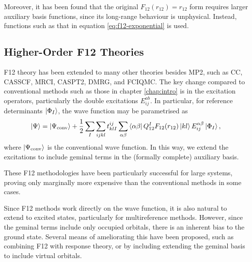 Moreover, it has been found that the original $F_{12}(r_{12})=r_{12}$ form requires larger auxiliary basis functions, since its long-range behaviour is unphysical.\supercite{ten-noInitiation2004,ten-noNew2007} Instead, functions such as that in equation \ref{eq:f12-exponential} is used.

\subsection{Higher-Order F12 Theories}

F12 theory has been extended to many other theories besides MP2, such as \gls{CC}, \gls{CASSCF}, \gls{MRCI}, \gls{CASPT2}, \gls{DMRG}, and \gls{FCIQMC}.
\supercite{shiozakiMultireference2013,nogaCCR121992,nogaCoupled1994,gdanitzFormulation1993,gdanitzAccurately1998,flieglCoupledcluster2006,neissExtensions2006,kohnModified2009,bokhanCommunications2010,hofenerExtended2019,kedzuchMultireference2011,manbyExplicitly2006,neeseEfficient2009,wernerExplicitly2017,varganovVariational2010,ten-noSimple2007,shiozakiCommunication2010,sharmaSpectroscopic2014}
The key change compared to conventional methods such as those in chapter \ref{chap:intro} is in the excitation operators, particularly the double excitations $E_{ij}^{ab}$. In particular, for reference determinants $\ket{\Phi_I}$, the wave function may be parametrised as
\begin{equation}
    \ket\Psi = \ket{\Psi_\text{conv}} + \frac 12\sum_{I}\sum_{ijkl}t^{ij}_{klI}\sum_{\alpha\beta}\bra{\alpha\beta}Q_{12}^IF_{12}(r_{12})\ket{kl}E_{ij}^{\alpha\beta}\ket{\Phi_I},
\end{equation}
where $\ket{\Psi_\text{conv}}$ is the conventional wave function. In this way, we extend the excitations to include geminal terms in the (formally complete) auxiliary basis.

These F12 methodologies have been particularly successful for large systems, proving only marginally more expensive than the conventional methods in some cases.\supercite{adlerSimple2007,kniziaSimplified2009}

Since F12 methods work directly on the wave function, it is also natural to extend to excited states, particularly for multireference methods.
\supercite{floresAccurately2005,ten-noSimple2007,shiozakiCommunication2010,shiozakiExplicitly2011,flieglCoupledcluster2006}
However, since the geminal terms include only occupied orbitals, there is an inherent bias to the ground state.\supercite{flieglCoupledcluster2006,neissExtensions2006} Several means of ameliorating this have been proposed, such as combining F12 with response theory,\supercite{neissExtensions2006} or by including extending the geminal basis to include virtual orbitals.\supercite{kohnModified2009}

